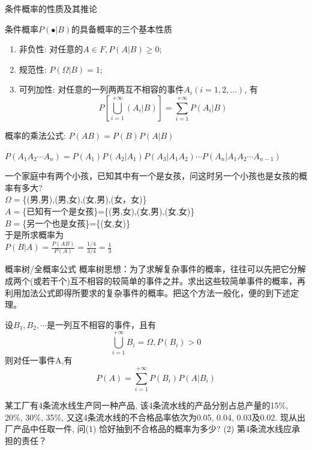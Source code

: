 \begin{frame}{条件概率的性质及其推论}
\begin{block}{条件概率$P(\bullet|B)$的具备概率的三个基本性质}
	\begin{enumerate}
		\item 非负性: 对任意的$A\in F, P(A|B)\ge 0$;
		\item 规范性: $P(\Omega|B)=1$;
		\item 可列加性: 对任意的一列两两互不相容的事件$A_i(i=1,2,\dots)$, 有
		\[P\left[\bigcup\limits_{i=1}^{+\infty}(A_i|B)\right]=\sum\limits_{i=1}^{+\infty}P(A_i|B) \]
	\end{enumerate}
\end{block}
\begin{corollary}
概率的乘法公式:  $P(AB)=P(B)P(A|B)$
\end{corollary}

\begin{corollary}
	$P(A_1A_2\cdots A_n)=P(A_1)P(A_2|A_1)P(A_3|A_1A_2)\cdots P(A_n|A_1A_2\cdots A_{n-1})$
\end{corollary}
\end{frame}

\begin{frame}
\begin{example}
	一个家庭中有两个小孩，已知其中有一个是女孩，问这时另一个小孩也是女孩的概率有多大?\\
	$\Omega=$\{(男,男),(男,女),(女,男),(女，女)\}\\
	$A=$\{已知有一个是女孩\}=\{(男,女),(女,男),(女,女)\}\\
	$B=$\{另一个也是女孩\}=\{(女,女)\}\\
	于是所求概率为\\
	$P(B|A)=\frac{P(AB)}{P(A)}=\frac{1/4}{3/4}=\frac{1}{3}$
\end{example}
\end{frame}

\begin{frame}{概率树/全概率公式}
概率树思想：为了求解复杂事件的概率，往往可以先把它分解成两个(或若干个)互不相容的较简单的事件之并。求出这些较简单事件的概率，再利用加法公式即得所要求的复杂事件的概率。把这个方法一般化，便的到下述定理。
\begin{theorem}
	设$B_1,B_2,\cdots$是一列互不相容的事件，且有
	\[\bigcup_{i=1}^{+\infty}B_i=\Omega,P(B_i)>0 \]
	则对任一事件A,有
	\[P(A)=\sum_{i=1}^{+\infty}P(B_i)P(A|B_i) \]	
\end{theorem}
\end{frame}

\begin{frame}
\begin{example}
	某工厂有4条流水线生产同一种产品, 该4条流水线的产品分别占总产量的15\%, 20\%, 30\%, 35\%, 又这4条流水线的不合格品率依次为0.05, 0.04, 0.03及0.02. 现从出厂产品中任取一件, 问(1) 恰好抽到不合格品的概率为多少? (2) 第4条流水线应承担的责任？
\end{example}
\end{frame}

